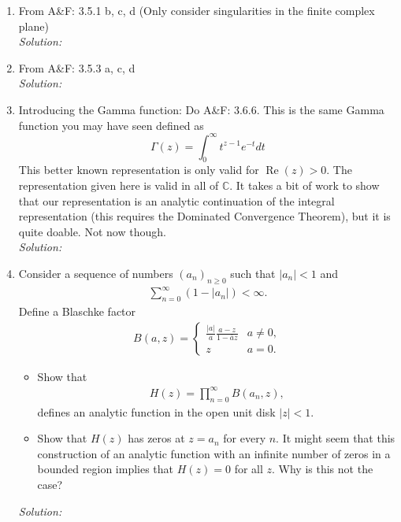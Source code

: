 \documentclass[10pt]{amsart}
\theoremstyle{nonumberplain}
\begin{document}
\mline
\begin{enumerate}[label={\bf {\arabic*}:}]
\item  From A\&F: 3.5.1 b, c, d (Only consider singularities in the finite
  complex plane) \\
\textit{Solution:} \\
\newpage

\item From A\&F: 3.5.3 a, c, d \\
\textit{Solution:} \\
\newpage

\item Introducing the Gamma function: Do A\&F: 3.6.6. This is the same Gamma function you may have seen defined as
$$
\Gamma(z)=\int_0^{\infty} t^{z-1} e^{-t} d t
$$
This better known representation is only valid for
$\operatorname{Re}(z)>0$. The representation given here is valid in
all of $\mathbb{C}$. It takes a bit of work to show that our
representation is an analytic continuation of the integral
representation (this requires the Dominated Convergence Theorem), but
it is quite doable. Not now though. \\
\textit{Solution:} \\
\newpage

\item Consider a sequence of numbers $(a_n)_{n \geq 0}$ such that
  $|a_n| < 1$ and
  \begin{align*}
    \sum_{n = 0}^\infty (1 - |a_n|) < \infty.
  \end{align*}
  Define a Blaschke  factor
  \begin{align*}
    B(a,z) = \begin{cases} \frac{|a|}{a} \frac{ a - z}{ 1 - \bar a z}
      & a \neq 0,\\
      z & a  =0.\end{cases}
  \end{align*}
  \begin{itemize}
  \item Show that
  \begin{align*}
    H(z) = \prod_{n=0}^\infty B(a_n,z),
  \end{align*}
  defines an analytic function in the open unit disk $|z| < 1$.
  \item Show that $H(z)$ has zeros at $z = a_n$ for every $n$.  It
    might seem that this construction of an analytic function with an
    infinite number of zeros in a bounded region implies that $H(z) =
    0$ for all $z$.  Why is this not the case? \\
  \end{itemize}
\textit{Solution:} \\
\newpage


\end{enumerate}
\end{document}
